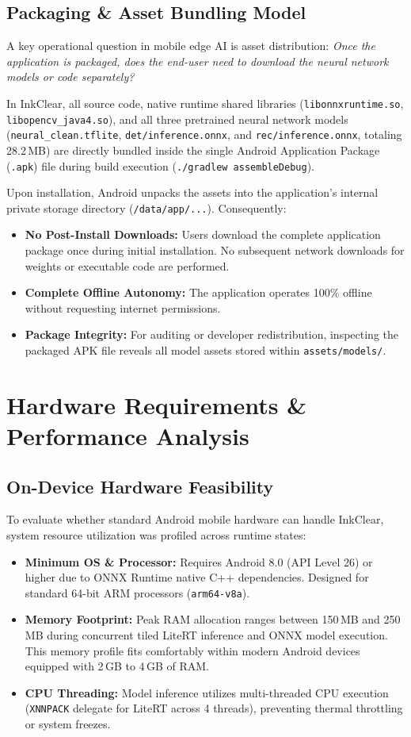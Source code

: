 \documentclass[11pt,a4paper]{article}
\begin{document}
\subsection{Packaging \& Asset Bundling Model}
A key operational question in mobile edge AI is asset distribution: \textit{Once the application is packaged, does the end-user need to download the neural network models or code separately?}

{\sloppy
In InkClear, all source code, native runtime shared libraries (\texttt{libonnxruntime.so}, \texttt{libopencv\_java4.so}), and all three pretrained neural network models (\texttt{neural\_clean.tflite}, \texttt{det/inference.onnx}, and \texttt{rec/inference.onnx}, totaling 28.2\,MB) are directly bundled inside the single Android Application Package (\texttt{.apk}) file during build execution (\texttt{./gradlew assembleDebug}).
}

Upon installation, Android unpacks the assets into the application's internal private storage directory (\texttt{/data/app/...}). Consequently:
\begin{itemize}[leftmargin=*]
  \item \textbf{No Post-Install Downloads:} Users download the complete application package once during initial installation. No subsequent network downloads for weights or executable code are performed.
  \item \textbf{Complete Offline Autonomy:} The application operates 100\% offline without requesting internet permissions.
  \item \textbf{Package Integrity:} For auditing or developer redistribution, inspecting the packaged APK file reveals all model assets stored within \texttt{assets/models/}.
\end{itemize}

\section{Hardware Requirements \& Performance Analysis}

\subsection{On-Device Hardware Feasibility}
To evaluate whether standard Android mobile hardware can handle InkClear, system resource utilization was profiled across runtime states:
\begin{itemize}[leftmargin=*]
  \item \textbf{Minimum OS \& Processor:} Requires Android 8.0 (API Level 26) or higher due to ONNX Runtime native C++ dependencies. Designed for standard 64-bit ARM processors (\texttt{arm64-v8a}).
  \item \textbf{Memory Footprint:} Peak RAM allocation ranges between 150\,MB and 250\,MB during concurrent tiled LiteRT inference and ONNX model execution. This memory profile fits comfortably within modern Android devices equipped with 2\,GB to 4\,GB of RAM.
  \item \textbf{CPU Threading:} Model inference utilizes multi-threaded CPU execution (\texttt{XNNPACK} delegate for LiteRT across 4 threads), preventing thermal throttling or system freezes.
\end{itemize}
\end{document}
